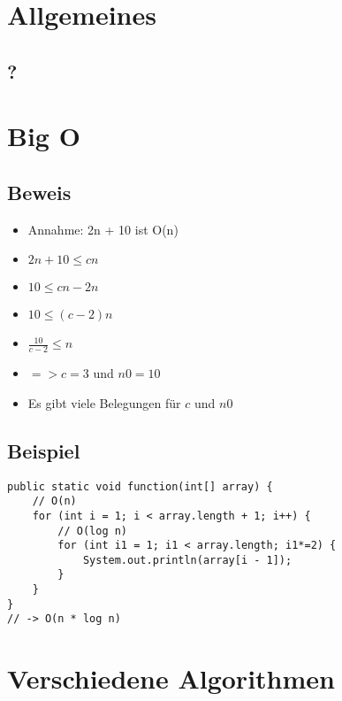 

\newcommand{\SUBJECT}{}
\newcommand{\TITLE}{Cheat Sheet Objektorientierte Programmierung 2}



\begin{multicols*}{5}
    \setlength{\columnseprule}{0.4pt}
		\footnotesize

\section{Allgemeines}
	\subsection{?}

\section{Big O}

	\subsection{Beweis}
	\begin{itemize}
		\item Annahme: 2n + 10 ist O(n)
		\item $2n + 10 \leq cn$
		\item $10 \leq cn - 2n$
		\item $10 \leq (c - 2)n$
		\item $\frac{10}{c-2} \leq n$
		\item $=> c=3$ und $n0=10$
		\item Es gibt viele Belegungen für $c$ und $n0$
	\end{itemize}

	\subsection{Beispiel}
	\begin{lstlisting}
public static void function(int[] array) {
	// O(n)
	for (int i = 1; i < array.length + 1; i++) {
		// O(log n)
		for (int i1 = 1; i1 < array.length; i1*=2) {
			System.out.println(array[i - 1]);
		}
	}
}
// -> O(n * log n)
	\end{lstlisting}

\section{Verschiedene Algorithmen}

\end{multicols*}
